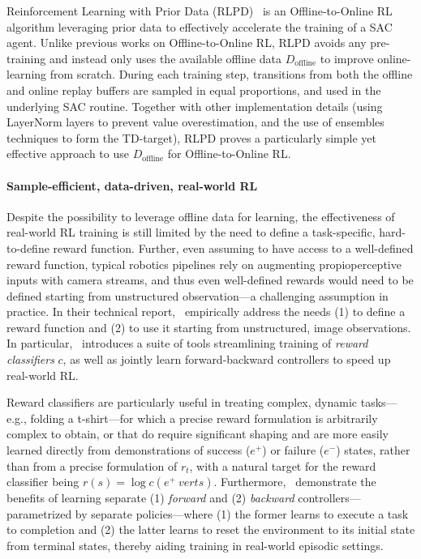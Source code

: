 Reinforcement Learning with Prior Data (RLPD)~\citep{ballEfficientOnlineReinforcement2023} is an Offline-to-Online RL algorithm leveraging prior data to effectively accelerate the training of a SAC agent.
Unlike previous works on Offline-to-Online RL, RLPD avoids any pre-training and instead only uses the available offline data \( D_\text{offline} \) to improve online-learning from scratch.
During each training step, transitions from both the offline and online replay buffers are sampled in equal proportions, and used in the underlying SAC routine.
Together with other implementation details (using LayerNorm layers to prevent value overestimation, and the use of ensembles techniques to form the TD-target), RLPD proves a particularly simple yet effective approach to use \( D_\text{offline} \) for Offline-to-Online RL.

\paragraph{Sample-efficient, data-driven, real-world RL}
Despite the possibility to leverage offline data for learning, the effectiveness of real-world RL training is still limited by the need to define a task-specific, hard-to-define reward function.
Further, even assuming to have access to a well-defined reward function, typical robotics pipelines rely on augmenting propioperceptive inputs with camera streams, and thus even well-defined rewards would need to be defined starting from unstructured observation---a challenging assumption in practice.
In their technical report,~\citet{luoSERLSoftwareSuite2025} empirically address the needs (1) to define a reward function and (2) to use it starting from unstructured, image observations.
In particular,~\citet[SERL]{luoSERLSoftwareSuite2025} introduces a suite of tools streamlining training of \emph{reward classifiers} \( c \), as well as jointly learn forward-backward controllers to speed up real-world RL.

Reward classifiers are particularly useful in treating complex, dynamic tasks---e.g., folding a t-shirt---for which a precise reward formulation is arbitrarily complex to obtain, or that do require significant shaping and are more easily learned directly from demonstrations of success (\(e^+\)) or failure (\(e^-\)) states, rather than from a precise formulation of \( r_t \), with a natural target for the reward classifier being \( r(s) = \log c(e^+ \ vert s ) \).
Furthermore,~\citet{luoSERLSoftwareSuite2025} demonstrate the benefits of learning separate (1) \emph{forward} and (2) \emph{backward} controllers---parametrized by separate policies---where (1) the former learns to execute a task to completion and (2) the latter learns to reset the environment to its initial state from terminal states, thereby aiding training in real-world episodic settings.


